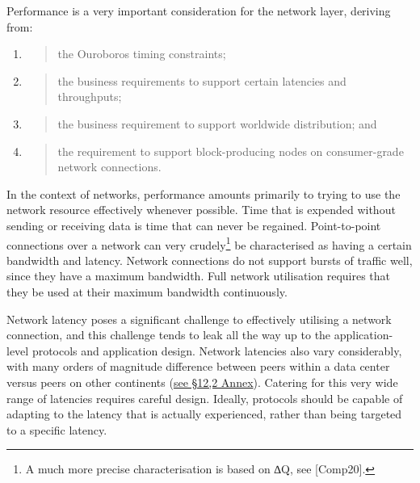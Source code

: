 \documentclass[]{article}
\begin{document}
Performance is a very important consideration for the network layer,
deriving from:

\begin{enumerate}
\def\labelenumi{\arabic{enumi}.}
\item
  \begin{quote}
  the Ouroboros timing constraints;
  \end{quote}
\item
  \begin{quote}
  the business requirements to support certain latencies and
  throughputs;
  \end{quote}
\item
  \begin{quote}
  the business requirement to support worldwide distribution; and
  \end{quote}
\item
  \begin{quote}
  the requirement to support block-producing nodes on consumer-grade
  network connections.
  \end{quote}
\end{enumerate}

In the context of networks, performance amounts primarily to trying to
use the network resource effectively whenever possible. Time that is
expended without sending or receiving data is time that can never be
regained. Point-to-point connections over a network can very
crudely\footnote{A much more precise characterisation is based on ∆Q,
  see {[}Comp20{]}.} be characterised as having a certain bandwidth and
latency. Network connections do not support bursts of traffic well,
since they have a maximum bandwidth. Full network utilisation requires
that they be used at their maximum bandwidth continuously.

Network latency poses a significant challenge to effectively utilising a
network connection, and this challenge tends to leak all the way up to
the application-level protocols and application design. Network
latencies also vary considerably, with many orders of magnitude
difference between peers within a data center versus peers on other
continents (\protect\hyperlink{tcp-rpc-response-behavior}{{see §12,2
Annex}}). Catering for this very wide range of latencies requires
careful design. Ideally, protocols should be capable of adapting to the
latency that is actually experienced, rather than being targeted to a
specific latency.
\end{document}
